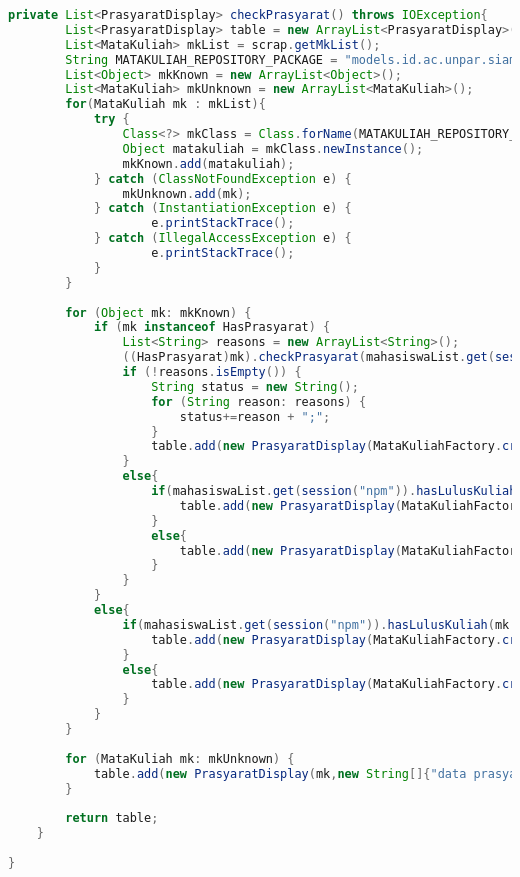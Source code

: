 \begin{lstlisting}[language=Java,basicstyle=\tiny,caption=Application.java]
    private List<PrasyaratDisplay> checkPrasyarat() throws IOException{
    	List<PrasyaratDisplay> table = new ArrayList<PrasyaratDisplay>();
    	List<MataKuliah> mkList = scrap.getMkList();
        String MATAKULIAH_REPOSITORY_PACKAGE = "models.id.ac.unpar.siamodels.matakuliah"; 
    	List<Object> mkKnown = new ArrayList<Object>(); 
    	List<MataKuliah> mkUnknown = new ArrayList<MataKuliah>(); 
        for(MataKuliah mk : mkList){
	        try {
	            Class<?> mkClass = Class.forName(MATAKULIAH_REPOSITORY_PACKAGE + "." + mk.kode());
	            Object matakuliah = mkClass.newInstance();
	            mkKnown.add(matakuliah);
	        } catch (ClassNotFoundException e) {
	        	mkUnknown.add(mk);
	        } catch (InstantiationException e) {
	                e.printStackTrace();
	        } catch (IllegalAccessException e) {
	                e.printStackTrace();
	        }           
        }
        
        for (Object mk: mkKnown) {
            if (mk instanceof HasPrasyarat) {
                List<String> reasons = new ArrayList<String>();
                ((HasPrasyarat)mk).checkPrasyarat(mahasiswaList.get(session("npm")), reasons);
                if (!reasons.isEmpty()) {
                    String status = new String();
            		for (String reason: reasons) {
            			status+=reason + ";";
                    }
                    table.add(new PrasyaratDisplay(MataKuliahFactory.createMataKuliah(mk.getClass().getSimpleName(),MataKuliahFactory.UNKNOWN_SKS,MataKuliahFactory.UNKNOWN_NAMA),status.split(";")));
                }
                else{
                    if(mahasiswaList.get(session("npm")).hasLulusKuliah(mk.getClass().getSimpleName())){
                    	table.add(new PrasyaratDisplay(MataKuliahFactory.createMataKuliah(mk.getClass().getSimpleName(),MataKuliahFactory.UNKNOWN_SKS,MataKuliahFactory.UNKNOWN_NAMA),new String[]{"sudah lulus"}));
                    }
                    else{ 
                    	table.add(new PrasyaratDisplay(MataKuliahFactory.createMataKuliah(mk.getClass().getSimpleName(),MataKuliahFactory.UNKNOWN_SKS,MataKuliahFactory.UNKNOWN_NAMA),new String[]{"memenuhi syarat"}));
                    }
                }
            }
            else{ 
            	if(mahasiswaList.get(session("npm")).hasLulusKuliah(mk.getClass().getSimpleName())){
                	table.add(new PrasyaratDisplay(MataKuliahFactory.createMataKuliah(mk.getClass().getSimpleName(),MataKuliahFactory.UNKNOWN_SKS,MataKuliahFactory.UNKNOWN_NAMA),new String[]{"sudah lulus"}));
                }
                else{ 
                	table.add(new PrasyaratDisplay(MataKuliahFactory.createMataKuliah(mk.getClass().getSimpleName(),MataKuliahFactory.UNKNOWN_SKS,MataKuliahFactory.UNKNOWN_NAMA),new String[]{"tidak memiliki prasyarat"}));
                }
            }
        }
        
        for (MataKuliah mk: mkUnknown) {
        	table.add(new PrasyaratDisplay(mk,new String[]{"data prasyarat tidak tersedia"}));
        }
        
        return table;
    }
    
}
\end{lstlisting}

